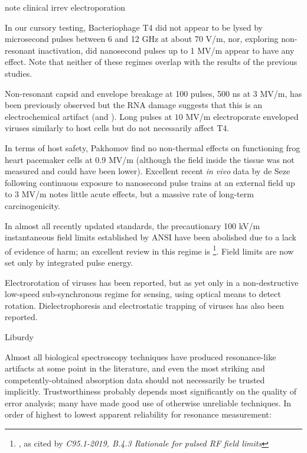 \documentclass[paper.tex]{subfiles}
\begin{document}
note clinical irrev electroporation 



In our cursory testing, Bacteriophage T4 did not appear to be lysed by microsecond pulses between 6 and 12 GHz at about 70 V/m, nor, exploring non-resonant inactivation, did nanosecond pulses up to 1 MV/m appear to have any effect. Note that neither of these regimes overlap with the results of the previous studies.

 Non-resonant capsid and envelope breakage at 100 pulses, 500 ns at 3 MV/m, has been previously observed\cite{Inactivation1990} but the RNA damage suggests that this is an electrochemical artifact \cite{Formation1996} (and \cite{Microwave1987}). Long pulses at $10$ MV/m electroporate enveloped viruses similarly to host cells\cite{AC2017} but do not necessarily affect T4\cite{Manipulation2013}. 

In terms of host safety, Pakhomov \cite{Comparative} find no non-thermal effects on functioning frog heart pacemaker cells at 0.9 MV/m (although the field inside the tissue was not measured and could have been lower). Excellent recent \textit{in vivo} data by de Seze following continuous exposure to nanosecond pulse trains at an external field up to 3 MV/m \cite{Repeated2020} notes little acute effects, but a massive rate of long-term carcinogenicity.

In almost all recently updated standards, the precautionary 100 kV/m instantaneous field limits established by ANSI have been abolished due to a lack of evidence of harm; an excellent review in this regime is \footnote{\cite{treatyelectromagnetic}, as cited by \textit{C95.1-2019, B.4.3 Rationale for pulsed RF field limits}}. Field limits are now set only by integrated pulse energy.

Electrorotation\cite{Electrorotation1988}\cite{Electrorotation1997} of viruses has been reported\cite{Analysis2004}\cite{New1999}\cite{comprehensive2001}, but as yet only in a non-destructive low-speed sub-synchronous regime for sensing, using optical means to detect rotation. Dielectrophoresis and electrostatic trapping of viruses has also been reported.



Liburdy

Almost all biological spectroscopy techniques have produced resonance-like artifacts at some point in the literature, and even the most striking and competently-obtained absorption data should not necessarily be trusted implicitly. Trustworthiness probably depends most significantly on the quality of error analysis; many have made good use of otherwise unreliable techniques. In order of highest to lowest apparent reliability for resonance measurement:
\end{document}

